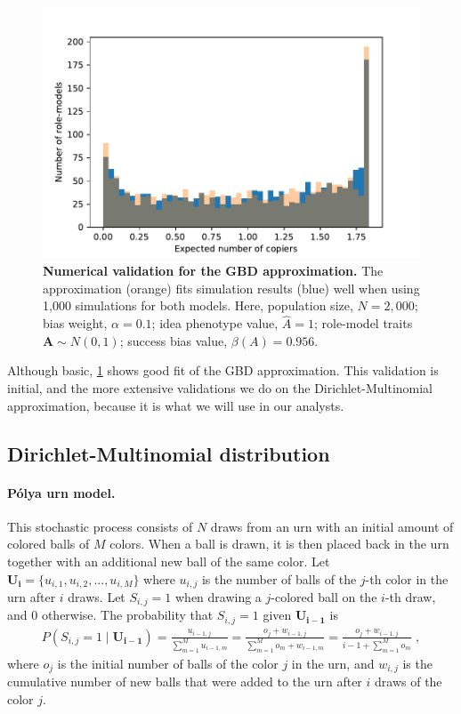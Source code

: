 \documentclass[12pt]{extarticle}
\let\vec\mathbf
\begin{document}
\begin{figure}[h]
    \includegraphics[width=\linewidth]{../figures/chi_square_stats/GBD_validation.pdf}
  \caption{
  \textbf{Numerical validation for the GBD approximation.}
  The approximation (orange) fits simulation results (blue) well when using 1,000 simulations for both models.
  Here, population size, $N=2,000$; bias weight, $\alpha=0.1$; idea phenotype value, $\hat{A}=1$; role-model traits $\vec{A} \sim N(0,1)$; success bias value, $\beta(A)=0.956$.}	
  \label{fig:GBD}
\end{figure}

Although basic, \cref{fig:GBD} shows good fit of the GBD approximation.
This validation is initial, and the more extensive validations we do on the Dirichlet-Multinomial approximation, because it is what we will use in our analysts.

\subsection*{Dirichlet-Multinomial distribution}

\paragraph{P\'{o}lya urn model.}
This stochastic process consists of $N$ draws from an urn with an initial amount of colored balls of $M$ colors. When a ball is drawn, it is then placed back in the urn together with an additional new ball of the same color.
Let $\vec{U_i} = \{u_{i,1},u_{i,2},...,u_{i,M}\}$  where $u_{i,j}$ is the number of balls of the $j$-th color in the urn after $i$ draws.
Let $S_{i,j}=1$ when drawing a $j$-colored ball on the $i$-th draw, and $0$ otherwise. The probability that $S_{i,j}=1$ given $\vec{U_{i-1}}$ is
\begin{equation}\label{eq:polya}
\begin{split}
P(S_{i,j} = 1 \mid \vec{U_{i-1}}) = 
\frac{u_{i-1,j}}{\sum\limits_{m=1}^{M} u_{i-1,m}} = 
\frac{o_j + w_{i-1,j}}{\sum\limits_{m=1}^{M} o_m + w_{i-1,m}} = 
\frac{o_j + w_{i-1,j}}{i-1 + \sum\limits_{m=1}^{M} o_m} \;,
\end{split}
\end{equation}
where $o_j$ is the initial number of balls of the color $j$ in the urn, and $w_{i,j}$ is the cumulative number of new balls that were added to the urn after $i$ draws of the color $j$.
\\
\end{document}
